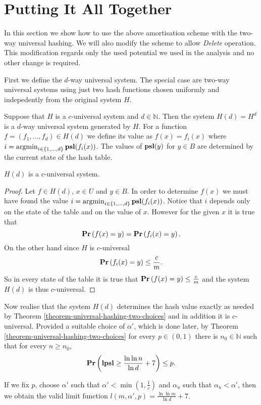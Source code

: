 \section{Putting It All Together}
In this section we show how to use the above amortisation scheme with the two-way universal hashing. We will also modify the scheme to allow \emph{Delete} operation. This modification regards only the used potential we used in the analysis and no other change is required.

First we define the $d$-way universal system. The special case are two-way universal systems using just two hash functions chosen uniformly and indepedently from the original system $H$.
\begin{definition} 
Suppose that $H$ is a $c$-universal system and $d \in \mathbb{N}$. Then the system $H(d) = H^d$ is a $d$-way universal system generated by $H$. For a function $f = (f_1, \dots, f_d) \in H(d)$ we define its value as $f(x) = f_i(x)$ where $i = \operatorname{argmin}_{i \in \{1, \dots, d\}} \mathbf{psl}(f_i(x))$. The values of $\mathbf{psl}(y)$ for $y \in B$ are determined by the current state of the hash table.
\end{definition}

\begin{lemma}
$H(d)$ is a $c$-universal system.
\begin{proof}
Let $f \in H(d)$, $x \in U$ and $y \in B$. In order to determine $f(x)$ we must have found the value $i = \operatorname{argmin}_{i \in \{1, \dots, d\}} \mathbf{psl}(f_i(x))$. Notice that $i$ depends only on the state of the table and on the value of $x$. However for the given $x$ it is true that \[ \mathbf{Pr}\left(f(x) = y\right) = \mathbf{Pr}\left(f_i(x) = y\right). \] On the other hand since $H$ is $c$-universal \[ \mathbf{Pr}\left(f_i(x) = y\right) \leq \frac{c}{m}. \] So in every state of the table it is true that $\mathbf{Pr}\left(f(x) = y\right) \leq \frac{c}{m}$ and the system $H(d)$ is thus $c$-universal.
\end{proof}
\end{lemma}

Now realise that the system $H(d)$ determines the hash value exactly as needed by Theorem \ref{theorem-universal-hashing-two-choices} and in addition it is $c$-universal. Provided a suitable choice of $\alpha'$, which is done later, by Theorem \ref{theorem-universal-hashing-two-choices} for every $p \in (0, 1)$ there is $n_0 \in \mathbb{N}$ such that for every $n \geq n_0$,
\[
	\mathbf{Pr}\left(\mathbf{lpsl} \geq \frac{\ln \ln n}{\ln d} + 7\right) \leq p.
\]

If we fix $p$, choose $\alpha'$ such that $\alpha' < \min(1, \frac{1}{c})$ and $\alpha_u$ such that $\alpha_u < \alpha'$, then we obtain the valid limit function $l(m, \alpha', p) = \frac{\ln \ln m}{\ln d} + 7$. 

